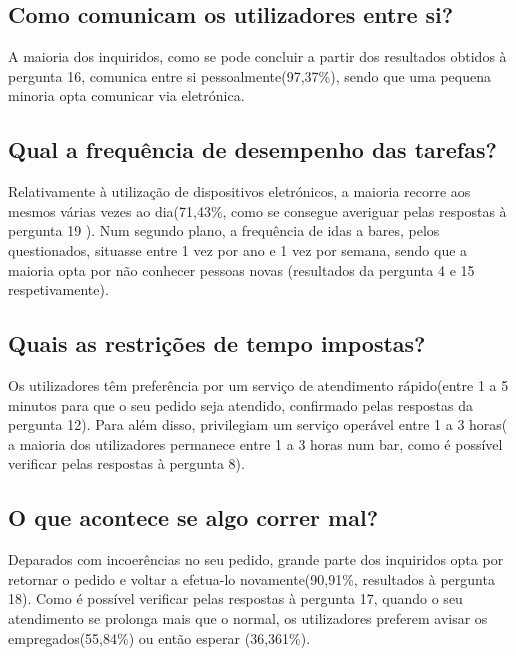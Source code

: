 \documentclass{article}
\begin{document}

\subsection*{Como comunicam os utilizadores entre si?}
A maioria dos inquiridos, como se pode concluir a partir dos resultados obtidos à pergunta 16, comunica entre si pessoalmente(97,37\%), sendo que uma pequena minoria opta comunicar via eletrónica.
\subsection*{Qual a frequência de desempenho das tarefas?}
Relativamente à utilização de dispositivos eletrónicos, a maioria recorre aos mesmos várias vezes ao dia(71,43\%, como se consegue averiguar pelas respostas à pergunta 19 ).
Num segundo plano, a frequência de idas a bares, pelos questionados, situasse entre 1 vez por ano e 1 vez por semana, sendo que a maioria opta por não conhecer pessoas novas (resultados da pergunta 4 e 15 respetivamente).
\subsection*{Quais as restrições de tempo impostas?}
Os utilizadores têm preferência por um serviço de atendimento rápido(entre 1 a 5 minutos para que o seu pedido seja atendido, confirmado pelas respostas da pergunta 12). Para além disso, privilegiam um serviço operável entre 1 a 3 horas( a maioria dos utilizadores permanece entre 1 a 3 horas num bar, como é possível verificar pelas respostas à pergunta 8).
\subsection*{O que acontece se algo correr mal?}
Deparados com incoerências no seu pedido, grande parte dos inquiridos opta por retornar o pedido e voltar a efetua-lo novamente(90,91\%, resultados à pergunta 18). Como é possível verificar pelas respostas à pergunta 17, quando o seu atendimento se prolonga mais que o normal, os utilizadores preferem avisar os empregados(55,84\%) ou então esperar (36,361\%).
\end{document}
